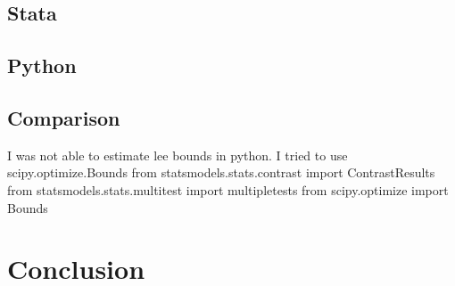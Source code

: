 \documentclass[10pt]{article}
\begin{document}
\subsection{Stata}


\subsection{Python}


\subsection{Comparison}

I was not able to estimate lee bounds in python. I tried to use scipy.optimize.Bounds
from statsmodels.stats.contrast import ContrastResults
from statsmodels.stats.multitest import multipletests
from scipy.optimize import Bounds

\section{Conclusion}
\end{document}
